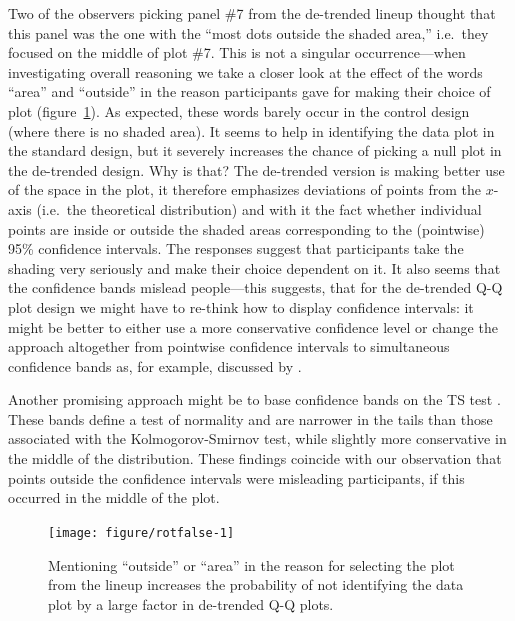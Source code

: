 \documentclass{article}\usepackage[]{graphicx}\usepackage[]{color}
\newenvironment{knitrout}{}{} %
\newcommand{\alnote}[1]{\todo[inline,color=green!40]{#1}}
\newcommand{\hhnote}[1]{\todo[inline,color=magenta!40]{#1}}
\begin{document}
Two of the observers picking panel \#7 from the de-trended lineup thought that this panel was the one with the ``most dots outside the shaded area,'' i.e.~they focused on the middle of plot \#7. This is not a singular occurrence---when investigating  overall reasoning we take a closer look at the effect of the  words ``area'' and ``outside'' in the reason participants gave for making their choice of plot (figure~\ref{fig:rotfalse}). As expected, these words barely occur in the control design (where there is no shaded area). It seems to help in identifying the data plot in the standard design, but it severely  increases the chance of picking a null plot in the de-trended design. Why is that? The de-trended version is making better use of the space in the plot, it therefore  emphasizes deviations of points from the $x$-axis (i.e.~the theoretical distribution) and with it  the fact whether individual points are inside or outside the shaded areas corresponding to the (pointwise) 95\% confidence intervals. The responses suggest that participants take the shading very seriously and make their choice dependent on it. It also seems that the confidence bands mislead people---this suggests, that for the de-trended Q-Q plot design we might have to re-think how to display confidence intervals: it might be better to  either use  a more conservative  confidence level or change the approach altogether from pointwise confidence intervals to simultaneous confidence bands as, for example, discussed by \citet{Rosenkrantz:2000fd}.

Another promising approach might be to base confidence bands on the TS test \citep{buja:2013}. These bands define a test of normality and are narrower in the tails than those associated with the Kolmogorov-Smirnov test, while slightly more conservative in the middle of the distribution. These findings coincide with our observation that points  outside the confidence intervals were misleading participants, if this occurred in the middle of the plot.



\begin{figure}[hbt]
\centering
\begin{knitrout}
\color{fgcolor}
\texttt{[image: figure/rotfalse-1]} 

\end{knitrout}
\caption{\label{fig:rotfalse}Mentioning ``outside'' or ``area'' in the reason for selecting the plot from the lineup increases the probability of not identifying the data plot by a large factor in de-trended Q-Q plots. }
\end{figure}
\end{document}
